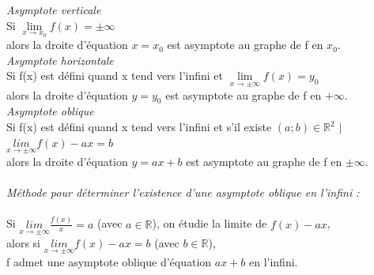 \documentclass[a4paper,10pt]{book}
\newcommand{\R}{\mathbb{R}}
\begin{document}
\textit{Asymptote verticale}\\
Si $\underset{x \rightarrow x_{0}}{\lim} f(x)=\pm\infty$\\
alors la droite d'équation $x=x_{0}$ est asymptote au graphe de f en $x_{0}$.\\

\textit{Asymptote horizontale}\\
Si f(x) est défini quand x tend vers l'infini et $\underset{x \rightarrow \pm\infty}{\lim} f(x)=y_{0}$\\
alors la droite d'équation $y=y_{0}$ est asymptote au graphe de f en $+\infty$.\\

\textit{Asymptote oblique}\\
Si f(x) est défini quand x tend vers l'infini et s'il existe $(a;b) \in \R^{2}$ $|$ $\underset{x \rightarrow \pm\infty}{lim} f(x)-ax=b$\\
alors la droite d'équation $y=ax+b$ est asymptote au graphe de f en $\pm\infty$.\\\\

\emph{Méthode pour déterminer l’existence d'une asymptote oblique en l'infini :}\\\\
Si $\underset{x\rightarrow \pm\infty}{lim} \frac{f(x)}{x}=a$ (avec $a \in \R$), on étudie la limite de $f(x)-ax$,\\
alors si $\underset{x\rightarrow \pm\infty}{lim} f(x)-ax=b$ (avec $b \in \R$),\\
f admet une asymptote oblique d'équation $ax+b$ en l'infini.
\end{document}
